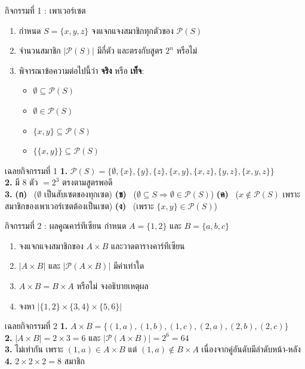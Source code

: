 \begin{frame}{กิจกรรมที่ 1 : เพาเวอร์เซต }
  \begin{enumerate}
    \item กำหนด $S = \{x, y, z\}$ จงแจกแจงสมาชิกทุกตัวของ $\mathcal{P}(S)$
    \item จำนวนสมาชิก $|\mathcal{P}(S)|$ มีกี่ตัว และตรงกับสูตร $2^n$ หรือไม่
    \item พิจารณาข้อความต่อไปนี้ว่า \textbf{จริง} หรือ \textbf{เท็จ}:
          \begin{itemize}
            \item[\textbf{(ก)}] $\emptyset \subseteq \mathcal{P}(S)$
            \item[\textbf{(ข)}] $\emptyset \in \mathcal{P}(S)$
            \item[\textbf{(ค)}] $\{x, y\} \subseteq \mathcal{P}(S)$
            \item[\textbf{(ง)}] $\{\{x, y\}\} \subseteq \mathcal{P}(S)$
          \end{itemize}
  \end{enumerate}
  \pause
  \begin{exampleblock}{เฉลยกิจกรรมที่ 1}
    \footnotesize
    \textbf{1.} $\mathcal{P}(S) = \{\emptyset, \{x\}, \{y\}, \{z\}, \{x,y\}, \{x,z\}, \{y,z\}, \{x,y,z\}\}$ \\
    \textbf{2.} มี 8 ตัว $= 2^3$ ตรงตามสูตรพอดี \\
    \textbf{3.} \textbf{(ก)} \TT\ ($\emptyset$ เป็นสับเซตของทุกเซต) \quad
    \textbf{(ข)} \TT\ ($\emptyset \subseteq S \Rightarrow \emptyset \in \mathcal{P}(S)$) \quad
    \textbf{(ค)} \FF\ ($x \notin \mathcal{P}(S)$ เพราะสมาชิกของเพาเวอร์เซตต้องเป็นเซต) \quad
    \textbf{(ง)} \TT\ (เพราะ $\{x,y\} \in \mathcal{P}(S)$)
  \end{exampleblock}
\end{frame}

\begin{frame}{กิจกรรมที่ 2 : ผลคูณคาร์ทีเซียน }
  กำหนด $A = \{1, 2\}$ และ $B = \{a, b, c\}$
  \begin{enumerate}
    \item จงแจกแจงสมาชิกของ $A \times B$ และวาดตารางคาร์ทีเซียน
    \item $|A \times B|$ และ $|\mathcal{P}(A \times B)|$ มีค่าเท่าใด
    \item $A \times B = B \times A$ หรือไม่ จงอธิบายเหตุผล
    \item จงหา $|\{1, 2\} \times \{3, 4\} \times \{5, 6\}|$
  \end{enumerate}
  \pause
  \begin{exampleblock}{เฉลยกิจกรรมที่ 2}
    \footnotesize
    \textbf{1.} $A \times B = \{(1,a), (1,b), (1,c), (2,a), (2,b), (2,c)\}$ \\
    \textbf{2.} $|A \times B| = 2 \times 3 = 6$ \quad และ \quad $|\mathcal{P}(A \times B)| = 2^6 = 64$ \\
    \textbf{3.} ไม่เท่ากัน เพราะ $(1,a) \in A \times B$ แต่ $(1,a) \notin B \times A$ เนื่องจากคู่อันดับมีลำดับหน้า-หลัง \\
    \textbf{4.} $2 \times 2 \times 2 = 8$ สมาชิก
  \end{exampleblock}
\end{frame}


